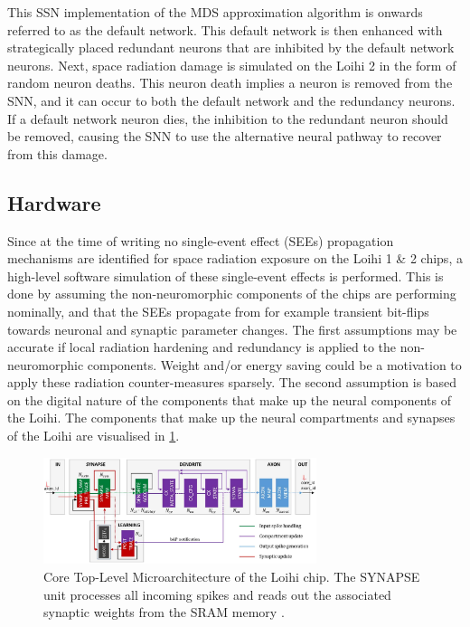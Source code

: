 \noindent This SSN implementation of the MDS approximation algorithm is onwards referred to as the default network. This default network is then enhanced with strategically placed redundant neurons that are inhibited by the default network neurons. Next, space radiation damage is simulated on the Loihi 2 in the form of random neuron deaths. This neuron death implies a neuron is removed from the SNN, and it can occur to both the default network and the redundancy neurons. If a default network neuron dies, the inhibition to the redundant neuron should be removed, causing the SNN to use the alternative neural pathway to recover from this damage.

\subsection{Hardware}\label{subsec:hardware}
Since at the time of writing no single-event effect (SEEs) propagation mechanisms are identified for space radiation exposure on the Loihi 1 \& 2 chips, a high-level software simulation of these single-event effects is performed. This is done by assuming the non-neuromorphic components of the chips are performing nominally, and that the SEEs propagate from for example transient bit-flips towards neuronal and synaptic parameter changes. The first assumptions may be accurate if local radiation hardening and redundancy is applied to the non-neuromorphic components. Weight and/or energy saving could be a motivation to apply these radiation counter-measures sparsely. The second assumption is based on the digital nature of the components that make up the neural components of the Loihi. The components that make up the neural compartments and synapses of the Loihi are visualised in \cref{fig:loihi_micro_architecture}.
\begin{figure}[H]
    \centering
    \includegraphics[width=8cm]{latex/Images/loihi_micro_architecture.png}
    \caption{Core Top-Level Microarchitecture of the Loihi chip. The SYNAPSE unit processes all incoming spikes and
    reads out the associated synaptic weights from the SRAM memory \cite{}%
    .}
    \label{fig:loihi_micro_architecture}
\end{figure}



